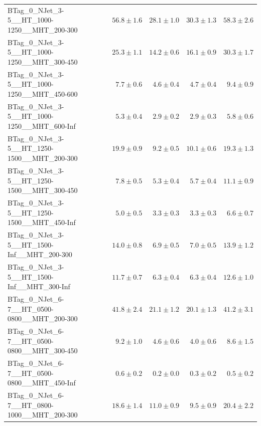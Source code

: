 \documentclass{beamer}
\begin{document}
\begin{frame}
\begin{tabular}{lrrrr}
      BTag\_0\_NJet\_3-5\_\_HT\_1000-1250\_\_MHT\_200-300 &              $56.8\pm1.6$&              $28.1\pm1.0$&              $30.3\pm1.3$&                  $58.3\pm2.6$ \\ 
      BTag\_0\_NJet\_3-5\_\_HT\_1000-1250\_\_MHT\_300-450 &              $25.3\pm1.1$&              $14.2\pm0.6$&              $16.1\pm0.9$&                  $30.3\pm1.7$ \\ 
      BTag\_0\_NJet\_3-5\_\_HT\_1000-1250\_\_MHT\_450-600 &               $7.7\pm0.6$&               $4.6\pm0.4$&               $4.7\pm0.4$&                   $9.4\pm0.9$ \\ 
      BTag\_0\_NJet\_3-5\_\_HT\_1000-1250\_\_MHT\_600-Inf &               $5.3\pm0.4$&               $2.9\pm0.2$&               $2.9\pm0.3$&                   $5.8\pm0.6$ \\ 
      BTag\_0\_NJet\_3-5\_\_HT\_1250-1500\_\_MHT\_200-300 &              $19.9\pm0.9$&               $9.2\pm0.5$&              $10.1\pm0.6$&                  $19.3\pm1.3$ \\ 
      BTag\_0\_NJet\_3-5\_\_HT\_1250-1500\_\_MHT\_300-450 &               $7.8\pm0.5$&               $5.3\pm0.4$&               $5.7\pm0.4$&                  $11.1\pm0.9$ \\ 
      BTag\_0\_NJet\_3-5\_\_HT\_1250-1500\_\_MHT\_450-Inf &               $5.0\pm0.5$&               $3.3\pm0.3$&               $3.3\pm0.3$&                   $6.6\pm0.7$ \\ 
       BTag\_0\_NJet\_3-5\_\_HT\_1500-Inf\_\_MHT\_200-300 &              $14.0\pm0.8$&               $6.9\pm0.5$&               $7.0\pm0.5$&                  $13.9\pm1.2$ \\ 
       BTag\_0\_NJet\_3-5\_\_HT\_1500-Inf\_\_MHT\_300-Inf &              $11.7\pm0.7$&               $6.3\pm0.4$&               $6.3\pm0.4$&                  $12.6\pm1.0$ \\ 
      BTag\_0\_NJet\_6-7\_\_HT\_0500-0800\_\_MHT\_200-300 &              $41.8\pm2.4$&              $21.1\pm1.2$&              $20.1\pm1.3$&                  $41.2\pm3.1$ \\ 
      BTag\_0\_NJet\_6-7\_\_HT\_0500-0800\_\_MHT\_300-450 &               $9.2\pm1.0$&               $4.6\pm0.6$&               $4.0\pm0.6$&                   $8.6\pm1.5$ \\ 
      BTag\_0\_NJet\_6-7\_\_HT\_0500-0800\_\_MHT\_450-Inf &               $0.6\pm0.2$&               $0.2\pm0.0$&               $0.3\pm0.2$&                   $0.5\pm0.2$ \\ 
      BTag\_0\_NJet\_6-7\_\_HT\_0800-1000\_\_MHT\_200-300 &              $18.6\pm1.4$&              $11.0\pm0.9$&               $9.5\pm0.9$&                  $20.4\pm2.2$ \\ 

\end{tabular}
\end{frame}
\end{document}
